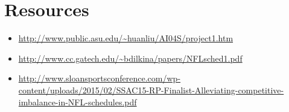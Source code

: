 \documentclass{article}
\begin{document}
	\section{Resources}
	\begin{itemize}
		\item \url{http://www.public.asu.edu/~huanliu/AI04S/project1.htm}
		\item \url{http://www.cc.gatech.edu/~bdilkina/papers/NFLsched1.pdf}
		\item \url{http://www.sloansportsconference.com/wp-content/uploads/2015/02/SSAC15-RP-Finalist-Alleviating-competitive-imbalance-in-NFL-schedules.pdf}
	\end{itemize}
	
\end{document}
